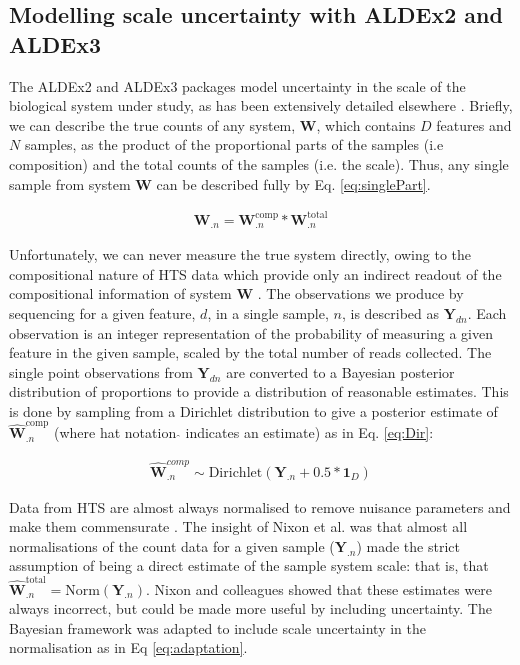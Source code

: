 \documentclass[10pt,letterpaper]{article}
\begin{document}
\subsection*{Modelling scale uncertainty with ALDEx2 and ALDEx3}
The ALDEx2 and ALDEx3 packages model uncertainty in the scale of the biological system under study, as has been extensively detailed elsewhere \cite{nixon_incorporating_2025, gloor_explicit_2025}. Briefly, we can describe the true counts of any system, $\mathbf{W}$, which contains $D$ features and $N$ samples, as the product of the proportional parts of the samples (i.e composition) and the total counts of the samples (i.e. the scale). Thus, any single sample from system $\mathbf{W}$ can be described fully by Eq. \ref{eq:singlePart}.

\begin{eqnarray}
	\label{eq:singlePart}
	\mathbf{W}_{.n} = \mathbf{W}^{\mathrm{comp}}_{.n} * \mathbf{W}^{\mathrm{total}}_{.n} 
\end{eqnarray}

Unfortunately, we can never measure the true system directly, owing to the compositional nature of HTS data which provide only an indirect readout of the compositional information of system $\mathbf{W}$ \cite{lovell_proportions_2011, gloor_microbiome_2017}. The observations we produce by sequencing for a given feature, $d$, in a single sample, $n$, is described as $\mathbf{Y}_{dn}$. Each observation is an integer representation of the probability of measuring a given feature in the given sample, scaled by the total number of reads collected\cite{fernandes:2013}. The single point observations from $\mathbf{Y}_{dn}$ are converted to a Bayesian posterior distribution of proportions \cite{fernandes:2013} to provide a distribution of reasonable estimates. This is done by sampling from a Dirichlet distribution to give a posterior estimate of $\hat{\mathbf{W}}^{\mathrm{comp}}_{.n}$ \cite{fernandes:2014} (where hat notation $\hat{}$ indicates an estimate) as in Eq. \ref{eq:Dir}:

\begin{eqnarray}
	\label{eq:Dir}
	\hat{\mathbf{W}}^{comp}_{.n} \sim \mathrm{Dirichlet}(\mathbf{Y}_{.n} + 0.5 * \mathbf{1}_{D})
\end{eqnarray}

Data from HTS are almost always normalised to remove nuisance parameters and make them commensurate \cite{robinson_scaling_2010}. The insight of Nixon et al. \cite{nixon_scale_2024} was that almost all normalisations of the count data for a given sample ($\mathbf{Y}_{.n}$) made the strict assumption of being a direct estimate of the sample system scale: that is, that $\hat{\mathbf{W}}^{\mathrm{total}}_{.n} = \mathrm{Norm}(\mathbf{Y}_{.n})$. Nixon and colleagues showed that these estimates were always incorrect, but could be made more useful by including uncertainty. The Bayesian framework was adapted to include scale uncertainty in the normalisation as in Eq \ref{eq:adaptation}.
\end{document}
